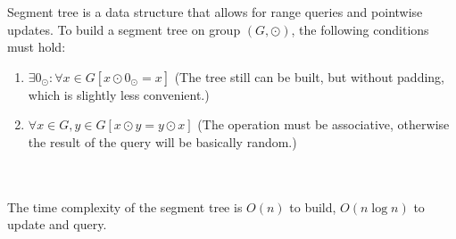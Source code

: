 Segment tree is a data structure that allows for range queries and pointwise updates. To build a segment tree on group $(G, \odot)$, the following conditions must hold:
\begin{enumerate}
  \item $\exists 0_{\odot}: \forall x \in G \left[ x \odot 0_{\odot} = x \right]$ (The tree still can be built, but without padding, which is slightly less convenient.)
  \item $\forall x \in G, y \in G \left[ x \odot y = y \odot x \right]$ (The operation must be associative, otherwise the result of the query will be basically random.)
\end{enumerate}
\\ \\
The time complexity of the segment tree is $O(n)$ to build, $O(n \log n)$ to update and query.
\\ \\

